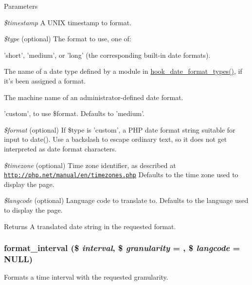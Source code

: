 \begin{DoxyParams}{Parameters}
\item[{\em \$timestamp}]A UNIX timestamp to format. \item[{\em \$type}](optional) The format to use, one of:
\begin{DoxyItemize}
\item 'short', 'medium', or 'long' (the corresponding built-\/in date formats).
\item The name of a date type defined by a module in \hyperlink{group__hooks_gaadde7af71d0b4f827cf7aac1c88c4d23}{hook\_\-date\_\-format\_\-types()}, if it's been assigned a format.
\item The machine name of an administrator-\/defined date format.
\item 'custom', to use \$format. Defaults to 'medium'. 
\end{DoxyItemize}\item[{\em \$format}](optional) If \$type is 'custom', a PHP date format string suitable for input to date(). Use a backslash to escape ordinary text, so it does not get interpreted as date format characters. \item[{\em \$timezone}](optional) Time zone identifier, as described at \href{http://php.net/manual/en/timezones.php}{\tt http://php.net/manual/en/timezones.php} Defaults to the time zone used to display the page. \item[{\em \$langcode}](optional) Language code to translate to. Defaults to the language used to display the page.\end{DoxyParams}
\begin{DoxyReturn}{Returns}
A translated date string in the requested format. 
\end{DoxyReturn}
\hypertarget{group__format_ga0615263857988e35c25d84c59a9733a4}{
\subsubsection[{format\_\-interval}]{\setlength{\rightskip}{0pt plus 5cm}format\_\-interval (\$ {\em interval}, \/  \$ {\em granularity} = {}, \/  \$ {\em langcode} = {\ttfamily NULL})}}
\label{group__format_ga0615263857988e35c25d84c59a9733a4}
Formats a time interval with the requested granularity.


